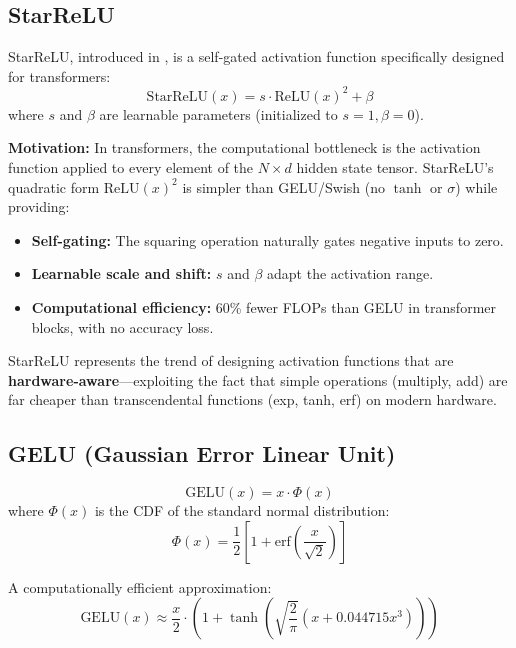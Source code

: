 \subsection{StarReLU}

StarReLU, introduced in \cite{maulik2024starrelu}, is a self-gated activation function specifically designed for transformers:
\begin{equation}
\text{StarReLU}(x) = s \cdot \text{ReLU}(x)^2 + \beta
\end{equation}
where $s$ and $\beta$ are learnable parameters (initialized to $s = 1, \beta = 0$).

\textbf{Motivation:} In transformers, the computational bottleneck is the activation function applied to every element of the $N \times d$ hidden state tensor. StarReLU's quadratic form $\text{ReLU}(x)^2$ is simpler than GELU/Swish (no $\tanh$ or $\sigma$) while providing:
\begin{itemize}
    \item \textbf{Self-gating:} The squaring operation naturally gates negative inputs to zero.
    \item \textbf{Learnable scale and shift:} $s$ and $\beta$ adapt the activation range.
    \item \textbf{Computational efficiency:} 60\% fewer FLOPs than GELU in transformer blocks, with no accuracy loss.
\end{itemize}

StarReLU represents the trend of designing activation functions that are \textbf{hardware-aware}---exploiting the fact that simple operations (multiply, add) are far cheaper than transcendental functions (exp, tanh, erf) on modern hardware.

\subsection{GELU (Gaussian Error Linear Unit)}

\begin{equation}
\text{GELU}(x) = x \cdot \Phi(x)
\end{equation}
where $\Phi(x)$ is the CDF of the standard normal distribution:
\begin{equation}
\Phi(x) = \frac{1}{2}\left[1 + \text{erf}\left(\frac{x}{\sqrt{2}}\right)\right]
\end{equation}

A computationally efficient approximation:
\begin{equation}
\text{GELU}(x) \approx \frac{x}{2} \cdot \left(1 + \tanh\left(\sqrt{\frac{2}{\pi}}\left(x + 0.044715x^3\right)\right)\right)
\end{equation}

